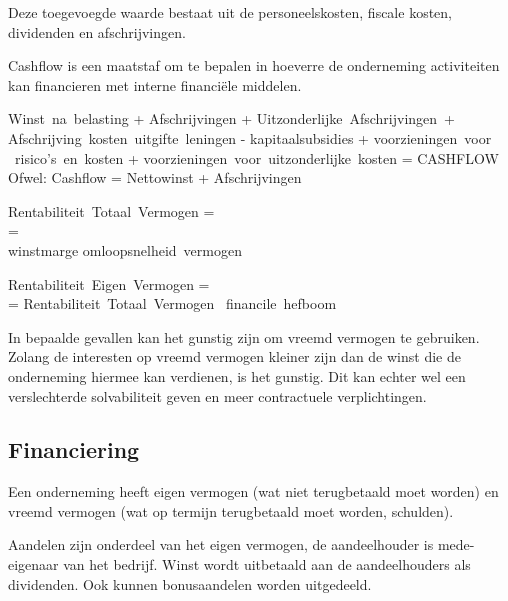 \documentclass[../../samenvatting.tex]{subfiles}
\begin{document}
Deze toegevoegde waarde bestaat uit de personeelskosten, fiscale kosten, dividenden en afschrijvingen.

Cashflow is een maatstaf om te bepalen in hoeverre de onderneming activiteiten kan financieren met interne financiële middelen.

\begin{equate}
Winst\ na\ belasting + Afschrijvingen + Uitzonderlijke\ Afschrijvingen\ +\\
Afschrijving\ kosten\ uitgifte\ leningen - kapitaalsubsidies + voorzieningen\ voor\\\ risico's\ en\ kosten + voorzieningen\ voor\ uitzonderlijke\ kosten = CASHFLOW\\
Ofwel: Cashflow = Nettowinst + Afschrijvingen
\end{equate}

\begin{equate}
    Rentabiliteit\ Totaal\ Vermogen = \\
    =  \cdot {}\\
    winstmarge \cdot omloopsnelheid\ vermogen
\end{equate}
\begin{equate}
Rentabiliteit\ Eigen\ Vermogen = \\
= Rentabiliteit\ Totaal\ Vermogen \cdot\ financile\ hefboom
\end{equate}

In bepaalde gevallen kan het gunstig zijn om vreemd vermogen te gebruiken. Zolang de interesten op vreemd vermogen kleiner zijn dan de winst die de onderneming hiermee kan verdienen, is het gunstig. Dit kan echter wel een verslechterde solvabiliteit geven en meer contractuele verplichtingen.

\subsection{Financiering}
Een onderneming heeft eigen vermogen (wat niet terugbetaald moet worden) en vreemd vermogen (wat op termijn terugbetaald moet worden, schulden).

Aandelen zijn onderdeel van het eigen vermogen, de aandeelhouder is mede-eigenaar van het bedrijf. Winst wordt uitbetaald aan de aandeelhouders als dividenden. Ook kunnen bonusaandelen worden uitgedeeld.
\end{document}
